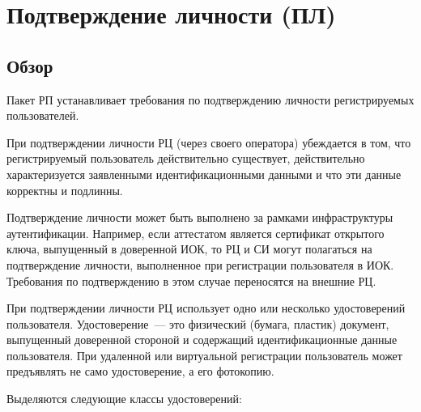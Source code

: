 \section{Подтверждение личности (ПЛ)}\label{IP}

\subsection{Обзор}\label{IP.Intro}

Пакет РП устанавливает требования по подтверждению личности регистрируемых 
пользователей.

При подтверждении личности РЦ (через своего оператора) убеждается 
в том, что регистрируемый пользователь действительно существует, 
действительно характеризуется заявленными идентификационными данными
и что эти данные корректны и подлинны.
%

Подтверждение личности может быть выполнено за рамками инфраструктуры
аутентификации. Например, если аттестатом является сертификат открытого ключа, 
выпущенный в доверенной ИОК, то РЦ и СИ могут полагаться на подтверждение 
личности, выполненное при регистрации пользователя в ИОК.
%
Требования по подтверждению в этом случае переносятся на внешние РЦ.

При подтверждении личности РЦ использует одно или несколько удостоверений
пользователя.  
%
Удостоверение~--- это физический (бумага, пластик) документ, выпущенный 
доверенной стороной и содержащий идентификационные данные 
пользователя.
%
%
При удаленной или виртуальной регистрации пользователь может 
предъявлять не само удостоверение, а его фотокопию.

Выделяются следующие классы удостоверений:

